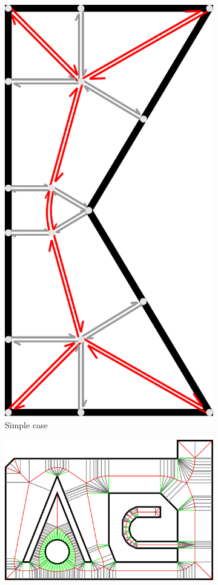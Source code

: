 \begin{figure}
\begin{subfigure}{0.3\columnwidth}
\centering
\includegraphics[height=1.5\columnwidth]{sources/method/half_edge_datastructure.pdf}
\caption{Simple case}
\label{shape_decomposition_simple}
\end{subfigure}
\begin{subfigure}{0.65\columnwidth}
\includegraphics[width=\columnwidth]{sources/method/MAT_VD_VQ.pdf}

\end{subfigure}
\end{figure}
